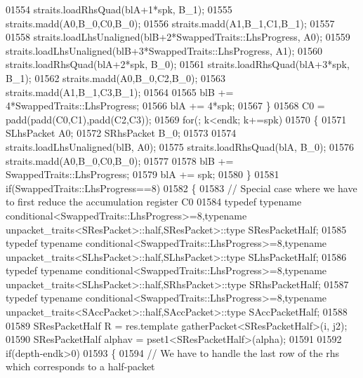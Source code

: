 \begin{DoxyCode}
01554               straits.loadRhsQuad(blA+1*spk, B\_1);
01555               straits.madd(A0,B\_0,C0,B\_0);
01556               straits.madd(A1,B\_1,C1,B\_1);
01557 
01558               straits.loadLhsUnaligned(blB+2*SwappedTraits::LhsProgress, A0);
01559               straits.loadLhsUnaligned(blB+3*SwappedTraits::LhsProgress, A1);
01560               straits.loadRhsQuad(blA+2*spk, B\_0);
01561               straits.loadRhsQuad(blA+3*spk, B\_1);
01562               straits.madd(A0,B\_0,C2,B\_0);
01563               straits.madd(A1,B\_1,C3,B\_1);
01564 
01565               blB += 4*SwappedTraits::LhsProgress;
01566               blA += 4*spk;
01567             \}
01568             C0 = padd(padd(C0,C1),padd(C2,C3));
01569             \textcolor{keywordflow}{for}(; k<endk; k+=spk)
01570             \{
01571               SLhsPacket A0;
01572               SRhsPacket B\_0;
01573 
01574               straits.loadLhsUnaligned(blB, A0);
01575               straits.loadRhsQuad(blA, B\_0);
01576               straits.madd(A0,B\_0,C0,B\_0);
01577 
01578               blB += SwappedTraits::LhsProgress;
01579               blA += spk;
01580             \}
01581             \textcolor{keywordflow}{if}(SwappedTraits::LhsProgress==8)
01582             \{
01583               \textcolor{comment}{// Special case where we have to first reduce the accumulation register C0}
01584               \textcolor{keyword}{typedef} \textcolor{keyword}{typename} conditional<SwappedTraits::LhsProgress>=8,\textcolor{keyword}{typename} 
      unpacket\_traits<SResPacket>::half,SResPacket>::type SResPacketHalf;
01585               \textcolor{keyword}{typedef} \textcolor{keyword}{typename} conditional<SwappedTraits::LhsProgress>=8,\textcolor{keyword}{typename} 
      unpacket\_traits<SLhsPacket>::half,SLhsPacket>::type SLhsPacketHalf;
01586               \textcolor{keyword}{typedef} \textcolor{keyword}{typename} conditional<SwappedTraits::LhsProgress>=8,\textcolor{keyword}{typename} 
      unpacket\_traits<SLhsPacket>::half,SRhsPacket>::type SRhsPacketHalf;
01587               \textcolor{keyword}{typedef} \textcolor{keyword}{typename} conditional<SwappedTraits::LhsProgress>=8,\textcolor{keyword}{typename} 
      unpacket\_traits<SAccPacket>::half,SAccPacket>::type SAccPacketHalf;
01588 
01589               SResPacketHalf R = res.template gatherPacket<SResPacketHalf>(i, j2);
01590               SResPacketHalf alphav = pset1<SResPacketHalf>(alpha);
01591 
01592               \textcolor{keywordflow}{if}(depth-endk>0)
01593               \{
01594                 \textcolor{comment}{// We have to handle the last row of the rhs which corresponds to a half-packet}

\end{DoxyCode}
